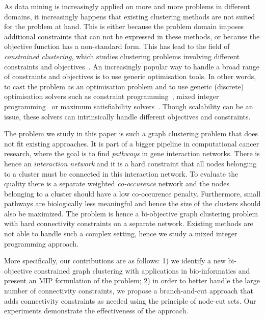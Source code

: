 \documentclass[conference]{IEEEtran}
\begin{document}
As data mining is increasingly applied on more and more problems in different domains, it increasingly happens that existing clustering methods are not suited for the problem at hand. This is either because the problem domain imposes additional constraints that can not be expressed in these methods, or because the objective function has a non-standard form. This has lead to the field of \textit{constrained clustering}, which studies clustering problems involving different constraints and objectives~\cite{basu2008constrained}. An increasingly popular way to handle a broad range of constraints and objectives is to use generic optimisation tools. In other words, to cast the problem as an optimisation problem and to use generic (discrete) optimisation solvers such as constraint programming~\cite{DaoDV13}, mixed integer programming~\cite{DBLP:conf/aaai/GilpinND13,DBLP:conf/cpaior/BabakiGN14} or maximum satisfiability solvers~\cite{DBLP:journals/ai/BergJ17}. Though scalability can be an issue, these solvers can intrinsically handle different objectives and constraints.

The problem we study in this paper is such a graph clustering problem that does not fit existing approaches. It is part of a bigger pipeline in computational cancer research, where the goal is to find \textit{pathways} in gene interaction networks. There is hence an \textit{interaction network} and it is a hard constraint that all nodes belonging to a cluster must be connected in this interaction network. To evaluate the quality there is a separate weighted \textit{co-occurence} network and the nodes belonging to a cluster should have a low co-occurence penalty. Furthermore, small pathways are biologically less meaningful and hence the size of the clusters should also be maximized. The problem is hence a bi-objective graph clustering problem with hard connectivity constraints on a separate network. Existing methods are not able to handle such a complex setting, hence we study a mixed integer programming approach.

More specifically, our contributions are as follows: 1) we identify a new bi-objective constrained graph clustering with applications in bio-informatics and present an MIP formulation of the problem; 2) in order to better handle the large number of connectivity constraints, we propose a branch-and-cut approach that adds connectivity constraints as needed using the principle of node-cut sets. Our experiments demonstrate the effectiveness of the approach.
\end{document}
